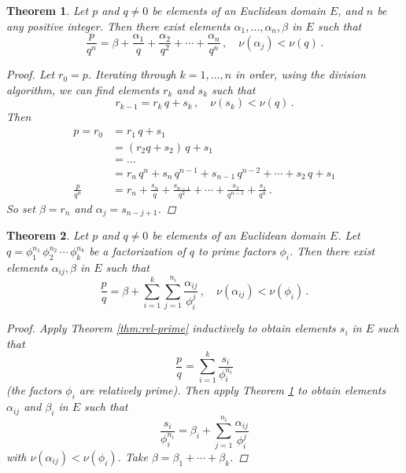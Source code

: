 \documentclass[12pt]{article}
\newtheorem{thm}{Theorem}
\begin{document}
\begin{thm}
\label{thm:powers}
Let $p$ and $q \neq 0$ be elements of an Euclidean domain $E$,
and $n$ be any positive integer.
Then there exist elements
$\alpha_1, \dotsc, \alpha_n, \beta$ in $E$ such that
\begin{equation*}
\frac{p}{q^n} = \beta + \frac{\alpha_1}{q} + \frac{\alpha_2}{q^2} + \dotsb + \frac{\alpha_n}{q^n}\,, \quad
\nu (\alpha_j) < \nu (q)\,.
\end{equation*}

\begin{proof}
Let $r_0 = p$.
Iterating through $k = 1, \dotsc, n$ in order, 
using the division algorithm, 
we can find elements $r_k$ and $s_k$
such that
\[
r_{k-1} = r_k \, q + s_k\,, \quad \nu (s_k) < \nu (q)\,.
\]
Then
\begin{align*}
p = r_0 &= r_1 \, q + s_1 \\
&= (r_2 q + s_2) \, q + s_1 \\
&= \hdots \\
&= r_n \, q^n + s_n \, q^{n-1} + s_{n-1} \, q^{n-2} + \dotsb + s_2 \, q + s_1 \\
\frac{p}{q^n} &= r_n + \frac{s_n}{q} + \frac{s_{n-1}}{q^2} + \dotsb + \frac{s_2}{q^{n-1}} + \frac{s_1}{q^n}\,.
\end{align*}
So set $\beta = r_n$ and $\alpha_j = s_{n-j + 1}$.
\end{proof}
\end{thm}

\begin{thm}
\label{thm:partial-fractions}
Let $p$ and $q \neq 0$ be elements of an Euclidean domain $E$.
Let $q = \phi_1^{n_1} \, \phi_2^{n_2} \, \dotsb \, \phi_k^{n_k}$
be a factorization of $q$ to prime factors $\phi_i$.
Then there exist elements $\alpha_{ij}, \beta$ in $E$
such
that
\begin{equation*}
\frac{p}{q} = \beta + \sum_{i=1}^k \sum_{j=1}^{n_i} \frac{\alpha_{ij}}{\phi_i^j}\,, \quad 
\nu (\alpha_{ij}) < \nu (\phi_i)\,.
\end{equation*}

\begin{proof}
Apply Theorem \ref{thm:rel-prime} inductively to obtain
elements $s_i$ in $E$ such that
\[
\frac{p}{q} = \sum_{i=1}^k \frac{s_i}{\phi_i^{n_i}}
\]
(the factors $\phi_i$ are relatively prime).
Then apply Theorem \ref{thm:powers} to obtain elements
$\alpha_{ij}$ and $\beta_i$ in $E$ such that
\[
\frac{s_i}{\phi_i^{n_i}} = \beta_i + \sum_{j=1}^{n_i} \frac{\alpha_{ij}}{\phi_i^j}
\]
with $\nu (\alpha_{ij}) < \nu (\phi_i)$.
Take $\beta = \beta_1 + \dotsb + \beta_k$.
\end{proof}
\end{thm}
\end{document}

